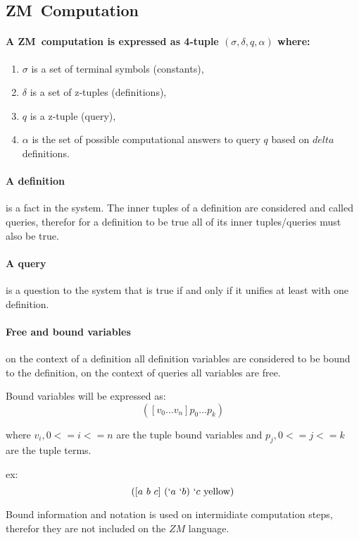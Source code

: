 \documentclass[11pt,a4paper]{report}
\newcommand{\zm}{ZM}
\newcommand{\var}[1]{`#1}
\begin{document}
\subsection{\zm\ Computation}
\paragraph{A \zm\ computation is expressed as 4-tuple $(\sigma, \delta, q, \alpha)$ where:}

\begin{enumerate}
\item $\sigma$ is a set of terminal symbols (constants),
\item $\delta$ is a set of z-tuples (definitions),
\item $q$ is a z-tuple (query),
\item $\alpha$ is the set of possible computational answers to query $q$ based on $delta$ definitions.
\end{enumerate}

\paragraph{A definition} is a fact in the system. The inner tuples of a definition are considered and called queries, therefor
for a definition to be true all of its inner tuples/queries must also be true.

\paragraph{A query} is a question to the system that is true if and only if it unifies at least with
one definition.

\paragraph{Free and bound variables} on the context of a definition all definition variables are considered
to be bound to the definition, on the context of queries all variables are free.

Bound variables will be expressed as:
\[
    ([v_{0} \ldots v_{n}] p_{0} \ldots p_{k})
\]

where $v_{i}, 0 <= i <= n$ are the tuple bound variables and $p_{j}, 0 <= j <=k$ are the tuple terms.

ex:
\[
    ([a\ b\ c]\ (\var{a}\ \var{b})\ \var{c}\ \text{yellow})
\]

Bound information and notation is used on intermidiate computation steps, therefor they are not included on the $\zm$ language.
\end{document}
